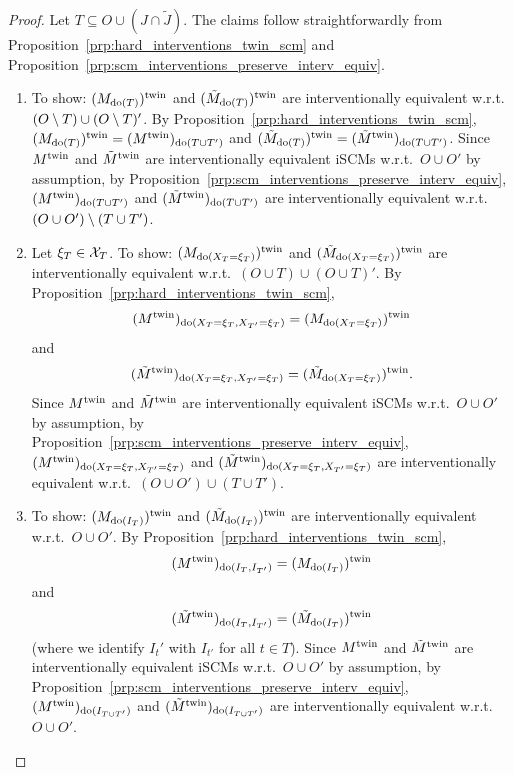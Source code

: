 \begin{proof}
  Let $T \subseteq O \cup (J \cap \tilde{J})$.
  The claims follow straightforwardly from Proposition~\ref{prp:hard_interventions_twin_scm} and Proposition~\ref{prp:scm_interventions_preserve_interv_equiv}.
  \begin{enumerate}
    \item 
      To show: $(M_{\operatorname{do}(T)})^{\mathrm{twin}}$ and $(\tilde{M}_{\operatorname{do}(T)})^{\mathrm{twin}}$ are interventionally equivalent w.r.t.\ $(O \setminus T) \cup (O \setminus T)'$.
      By Proposition~\ref{prp:hard_interventions_twin_scm}, $(M_{\operatorname{do}(T)})^{\mathrm{twin}} = (M^{\mathrm{twin}})_{\operatorname{do}(T \cup T')}$ and $(\tilde{M}_{\operatorname{do}(T)})^{\mathrm{twin}} = (\tilde{M}^{\mathrm{twin}})_{\operatorname{do}(T \cup T')}$.
      Since $M^{\mathrm{twin}}$ and $\tilde{M}^{\mathrm{twin}}$ are interventionally equivalent iSCMs w.r.t.\ $O \cup O'$ by assumption, by Proposition~\ref{prp:scm_interventions_preserve_interv_equiv}, 
      $(M^{\mathrm{twin}})_{\operatorname{do}(T \cup T')}$ and $(\tilde{M}^{\mathrm{twin}})_{\operatorname{do}(T \cup T')}$ are interventionally equivalent w.r.t.\ $(O \cup O') \setminus (T \cup T')$.

  \item 
    Let $\xi_T \in \mathcal{X}_T$.
    To show:
      $(M_{\operatorname{do}(X_T=\xi_T)})^{\mathrm{twin}}$ and $(\tilde{M}_{\operatorname{do}(X_T=\xi_T)})^{\mathrm{twin}}$ are interventionally equivalent w.r.t.\ $(O \cup T) \cup (O \cup T)'$.
    By Proposition~\ref{prp:hard_interventions_twin_scm},
    $$(M^{\mathrm{twin}})_{\operatorname{do}(X_T=\xi_T,X_{T'}=\xi_T)} = (M_{\operatorname{do}(X_{T}=\xi_T)})^{\mathrm{twin}}$$
    and
    $$(\tilde{M}^{\mathrm{twin}})_{\operatorname{do}(X_T=\xi_T,X_{T'}=\xi_T)} = (\tilde{M}_{\operatorname{do}(X_{T}=\xi_T)})^{\mathrm{twin}}.$$
    Since $M^{\mathrm{twin}}$ and $\tilde{M}^{\mathrm{twin}}$ are interventionally equivalent iSCMs w.r.t.\ $O \cup O'$ by assumption, by Proposition~\ref{prp:scm_interventions_preserve_interv_equiv}, 
      $(M^{\mathrm{twin}})_{\operatorname{do}(X_T=\xi_T,X_{T'}=\xi_T)}$ and $(\tilde{M}^{\mathrm{twin}})_{\operatorname{do}(X_T=\xi_T,X_{T'}=\xi_T)}$ are interventionally equivalent w.r.t.\ $(O \cup O') \cup (T \cup T')$.

  \item 
   To show: $(M_{\operatorname{do}(I_T)})^{\mathrm{twin}}$ and $(\tilde{M}_{\operatorname{do}(I_T)})^{\mathrm{twin}}$ are interventionally equivalent w.r.t.\ $O \cup O'$.
   By Proposition~\ref{prp:hard_interventions_twin_scm},
   $$(M^{\mathrm{twin}})_{\operatorname{do}(I_T,I_{T'})} = (M_{\operatorname{do}(I_T)})^{\mathrm{twin}}$$
   and
   $$(\tilde{M}^{\mathrm{twin}})_{\operatorname{do}(I_T,I_{T'})} = (\tilde{M}_{\operatorname{do}(I_T)})^{\mathrm{twin}}$$
   (where we identify $I_t'$ with $I_{t'}$ for all $t \in T$). 
   Since $M^{\mathrm{twin}}$ and $\tilde{M}^{\mathrm{twin}}$ are interventionally equivalent iSCMs w.r.t.\ $O \cup O'$ by assumption, by Proposition~\ref{prp:scm_interventions_preserve_interv_equiv}, 
   $(M^{\mathrm{twin}})_{\operatorname{do}(I_{T\cup T'})}$ and $(\tilde{M}^{\mathrm{twin}})_{\operatorname{do}(I_{T\cup T'})}$ are interventionally equivalent w.r.t.\ $O \cup O'$.
  \end{enumerate}
\end{proof}

